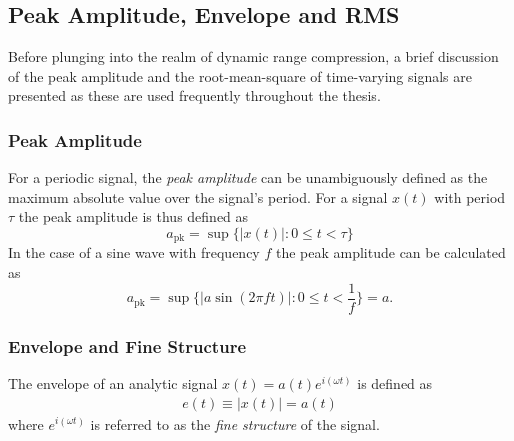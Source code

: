 \documentclass[../main2.tex]{subfiles}
\begin{document}
\subsection{Peak Amplitude, Envelope and RMS}
Before plunging into the realm of dynamic range compression, a brief discussion of
the peak amplitude and the root-mean-square of time-varying signals are presented as these are used frequently throughout the thesis.
\subsubsection{Peak Amplitude}
For a periodic signal, the \emph{peak amplitude} can be unambiguously defined as the maximum absolute value over the signal's period. For a signal $x(t)$ with period $\tau$ the peak amplitude is thus defined as
\begin{equation}
a_\text{pk} = \sup \{ |x(t)| :  0 \leq t < \tau \}
\end{equation}
In the case of a sine wave with frequency $f$ the peak amplitude can be calculated as
\begin{equation}\label{eq:sine_wave}
a_\text{pk} = \sup \{ |a \sin(2 \pi f t) | : 0 \leq t < \frac{1}{f} \} = a.\label{eq:a_pk}
\end{equation}
\subsubsection{Envelope and Fine Structure}\label{theory_envelope}
The envelope of an analytic signal $x(t) = a(t)e^{i(\omega t)}$ is defined as \cite{bedrosian1962analytic}
\begin{align}
e(t) \equiv |x(t)| = a(t)
\end{align}
where $e^{i(\omega t)}$ is referred to as the \emph{fine structure} of the signal.
\end{document}
